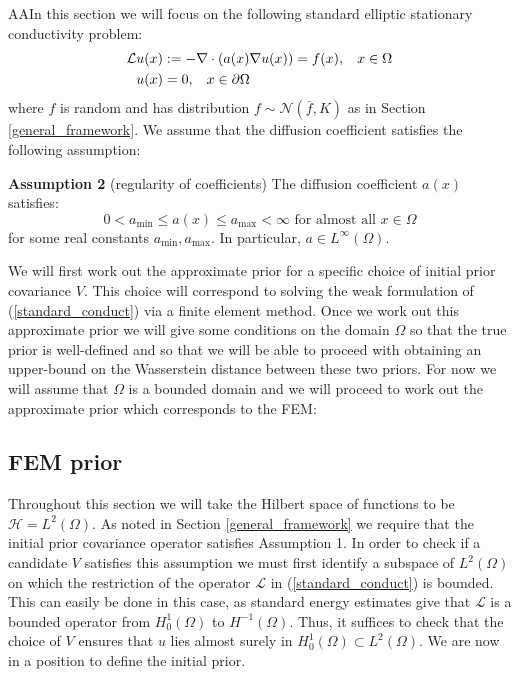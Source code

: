 AAIn this section we will focus on the following standard elliptic stationary conductivity problem:
\begin{align}
    \label{standard_conduct}
    \begin{split}
        \mathcal{L}u(x) &:= -\nabla\cdot(a(x)\nabla u(x))=f(x), \hspace{0.3cm} x\in\Omega \\
        u(x) &= 0, \hspace{0.3cm} x\in\partial\Omega
    \end{split}
\end{align}
where $f$ is random and has distribution $f\sim\mathcal{N}(\bar{f},K)$ as in Section \textcolor{blue}{\ref{general_framework}}. We assume that the diffusion coefficient satisfies the following assumption:

\noindent \textbf{Assumption 2} (regularity of coefficients) The diffusion coefficient $a(x)$ satisfies:
\begin{equation}
    \label{regularity_of_coeff}
    0<a_{\text{min}}\leq a(x)\leq a_{\text{max}}<\infty \text{ for almost all } x\in\Omega
\end{equation}
for some real constants $a_{\text{min}},a_{\text{max}}$. In particular, $a\in L^{\infty}(\Omega)$.

We will first work out the approximate prior for a specific choice of initial prior covariance $V$. This choice will correspond to solving the weak formulation of (\ref{standard_conduct}) via a finite element method. Once we work out this approximate prior we will give some conditions on the domain $\Omega$ so that the true prior is well-defined and so that we will be able to proceed with obtaining an upper-bound on the Wasserstein distance between these two priors. For now we will assume that $\Omega$ is a bounded domain and we will proceed to work out the approximate prior which corresponds to the FEM:

\subsection{FEM prior}

Throughout this section we will take the Hilbert space of functions to be $\mathcal{H}=L^{2}(\Omega)$. As noted in Section \textcolor{blue}{\ref{general_framework}} we require that the initial prior covariance operator satisfies Assumption 1. In order to check if a candidate $V$ satisfies this assumption we must first identify a subspace of $L^{2}(\Omega)$ on which the restriction of the operator $\mathcal{L}$ in (\ref{standard_conduct}) is bounded. This can easily be done in this case, as standard energy estimates give that $\mathcal{L}$ is a bounded operator from $H^{1}_{0}(\Omega)$ to $H^{-1}(\Omega)$. Thus, it suffices to check that the choice of $V$ ensures that $u$ lies almost surely in $H_{0}^{1}(\Omega)\subset L^{2}(\Omega)$. We are now in a position to define the initial prior.

